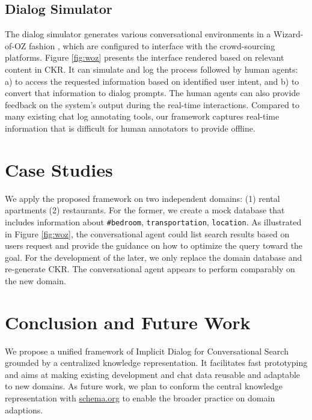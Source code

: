 \documentclass[letterpaper]{article} %
\begin{document}
\subsection{Dialog Simulator}
The dialog simulator generates various conversational environments in a Wizard-of-OZ fashion \cite{schatzmann2005quantitative}, which are configured to interface with the crowd-sourcing platforms. Figure \ref{fig:woz} presents the interface rendered based on relevant content in CKR. It can simulate and log the process followed by human agents: a) to access the requested information based on identified user intent, and b) to convert that information to dialog prompts. The human agents can also provide feedback on the system's output during the real-time interactions. Compared to many existing chat log annotating tools, our framework captures  real-time information that is difficult for human annotators to provide offline. %


\section{Case Studies}
We apply the proposed framework on two independent domains: (1) rental apartments (2) restaurants. For the former, we create a mock database that includes information about \texttt{\#bedroom}, \texttt{transportation}, \texttt{location}. As illustrated in Figure \ref{fig:woz}, the conversational agent could list search results based on users request and provide the guidance on how to optimize the query toward the goal. For the development of the later, we only replace the domain database and re-generate CKR. The conversational agent appears to perform comparably on the new domain.

\section{Conclusion and Future Work}
We propose a unified framework of Implicit Dialog for Conversational Search grounded by a centralized knowledge representation. It facilitates fast prototyping and aims at making existing development and chat data reusable and adaptable to new domains. As future work, we plan to conform the central knowledge representation with \url{schema.org} to enable the broader practice on domain adaptions.



\end{document}
